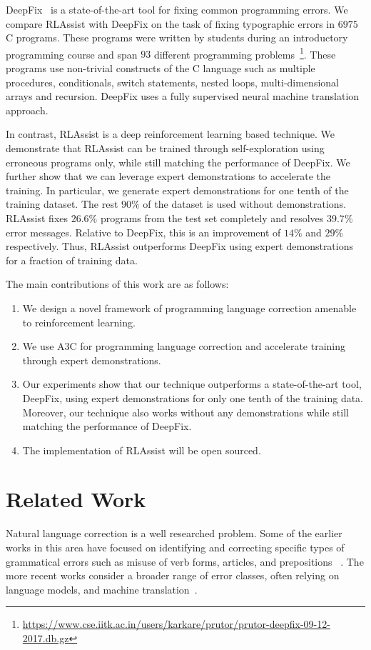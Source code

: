 \documentclass{article}
\begin{document}
DeepFix~\cite{gupta2017deepfix} is a state-of-the-art tool for fixing common
programming errors. 
We compare RLAssist with DeepFix on the task of fixing
typographic errors in $6975$ C programs. These programs were written by students
during an introductory programming course and
span $93$ different programming problems~\cite{gupta2017deepfix,prutor}\footnote{\small{\url{https://www.cse.iitk.ac.in/users/karkare/prutor/prutor-deepfix-09-12-2017.db.gz}}}.
These programs use non-trivial constructs of 
the C language such as multiple procedures, conditionals, switch statements, nested loops,
multi-dimensional arrays and recursion.
DeepFix uses a fully supervised neural machine translation approach.

In contrast, RLAssist is a deep reinforcement learning based technique.
We demonstrate that RLAssist can be trained through self-exploration using erroneous programs only, while still matching the performance of DeepFix.
We further show that we can leverage expert demonstrations to accelerate the training.
In particular, we generate expert demonstrations for one tenth of the training dataset. The rest $ 90\% $ of the dataset is used without demonstrations.
RLAssist fixes $26.6\%$ programs from the test set completely and resolves $39.7\%$ error messages.
Relative to DeepFix, this is an improvement of $14\%$ and $29\%$ respectively.
Thus, RLAssist outperforms DeepFix using expert demonstrations for a fraction of training data.

The main contributions of this work are as follows:
\begin{enumerate}
\item We design a novel framework of programming language correction amenable to
  reinforcement learning.
\item We use A3C for programming language correction and accelerate training 
through expert demonstrations.
\item Our experiments show that our technique outperforms a state-of-the-art tool, DeepFix, using expert demonstrations for only one tenth of the training data.
Moreover, our technique also works without any demonstrations while still matching the performance of DeepFix.
 \item The implementation of RLAssist will be open sourced.
\end{enumerate}
 \section{Related Work}
Natural language correction is a well researched problem.
Some of the earlier works in this area have focused on identifying and correcting specific types of grammatical errors such as misuse of verb forms, articles, and prepositions ~\cite{chodorow2007detection,han2006detecting,rozovskaya2010generating}.
The more recent works consider a broader range of error classes, often relying on language models, and machine translation~\cite{ng2014conll,rozovskaya2014illinois}.
\end{document}
